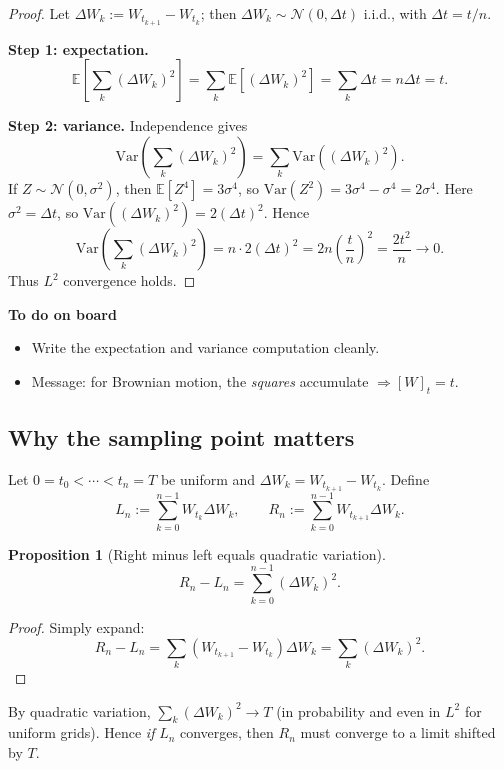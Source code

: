 \documentclass[11pt]{article}
\newcommand{\E}{\mathbb{E}}
\newcommand{\1}{\mathbf{1}}
\numberwithin{equation}{section}
\theoremstyle{plain}
\newtheorem{proposition}[theorem]{Proposition}
\theoremstyle{definition}
\theoremstyle{remark}
\begin{document}
\begin{proof}
Let $\Delta W_k:=W_{t_{k+1}}-W_{t_k}$; then $\Delta W_k\sim\mathcal{N}(0,\Delta t)$ i.i.d.,
with $\Delta t=t/n$.

\smallskip\noindent
\textbf{Step 1: expectation.}
\[
\E\!\left[\sum_k(\Delta W_k)^2\right]
=\sum_k \E[(\Delta W_k)^2]
=\sum_k \Delta t = n\Delta t=t.
\]

\smallskip\noindent
\textbf{Step 2: variance.}
Independence gives
\[
\mathrm{Var}\!\left(\sum_k(\Delta W_k)^2\right)=\sum_k \mathrm{Var}((\Delta W_k)^2).
\]
If $Z\sim\mathcal{N}(0,\sigma^2)$, then $\E[Z^4]=3\sigma^4$, so
$\mathrm{Var}(Z^2)=3\sigma^4-\sigma^4=2\sigma^4$.
Here $\sigma^2=\Delta t$, so $\mathrm{Var}((\Delta W_k)^2)=2(\Delta t)^2$.
Hence
\[
\mathrm{Var}\!\left(\sum_k(\Delta W_k)^2\right)=n\cdot 2(\Delta t)^2
=2n\left(\frac{t}{n}\right)^2=\frac{2t^2}{n}\to 0.
\]
Thus $L^2$ convergence holds.
\end{proof}

\textbf{To do on board}
\begin{itemize}[leftmargin=2em]
  \item Write the expectation and variance computation cleanly.
  \item Message: for Brownian motion, the \emph{squares} accumulate $\Rightarrow [W]_t=t$.
\end{itemize}


\subsection{Why the sampling point matters}

Let $0=t_0<\cdots<t_n=T$ be uniform and $\Delta W_k=W_{t_{k+1}}-W_{t_k}$.
Define
\[
L_n:=\sum_{k=0}^{n-1}W_{t_k}\Delta W_k,
\qquad
R_n:=\sum_{k=0}^{n-1}W_{t_{k+1}}\Delta W_k.
\]

\begin{proposition}[Right minus left equals quadratic variation]
\[
R_n-L_n=\sum_{k=0}^{n-1}(\Delta W_k)^2.
\]
\end{proposition}

\begin{proof}
Simply expand:
\[
R_n-L_n=\sum_k (W_{t_{k+1}}-W_{t_k})\Delta W_k=\sum_k (\Delta W_k)^2.
\]
\end{proof}

By quadratic variation, $\sum_k(\Delta W_k)^2\to T$ (in probability and even in $L^2$ for uniform grids).
Hence \emph{if} $L_n$ converges, then $R_n$ must converge to a limit shifted by $T$.
\end{document}
